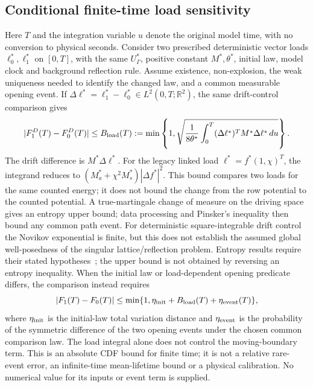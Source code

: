\documentclass[11pt]{article}
\begin{document}
\subsection{Conditional finite-time load sensitivity}
Here $T$ and the integration variable $u$ denote the original model time,
with no conversion to physical seconds.
Consider two prescribed deterministic vector loads $\ell_0^*,\ell_1^*$ on $[0,T]$,
with the same $U_\Gamma^*$, positive constant $M^*,\theta^*$, initial law,
model clock and background reflection rule. Assume existence, non-explosion,
the weak uniqueness needed to identify the changed law, and a common measurable
opening event. If $\Delta\ell^*=\ell_1^*-\ell_0^*\in L^2(0,T;\mathbb R^2)$,
the same drift-control comparison gives
\begin{equation}
 |F_1^D(T)-F_0^D(T)|\leq B_{\rm load}(T)
 :=\min\left\{1,\sqrt{\frac{1}{8\theta^*}
 \int_0^T (\Delta\ell^*)^TM^*\Delta\ell^*\,du}\right\}.
\end{equation}
The drift difference is $M^*\Delta\ell^*$. For the legacy linked load
$\ell^*=f^*(1,\chi)^T$, the integrand reduces to
$(M_a^*+\chi^2M_s^*)|\Delta f^*|^2$. This bound compares two loads
for the same counted energy; it does not bound the change from the row
potential to the counted potential. A true-martingale
change of measure on the driving space gives an entropy upper bound;
data processing and Pinsker's inequality then bound any common path event.
For deterministic square-integrable drift control the Novikov exponential
is finite, but this does not establish the assumed global well-posedness of
the singular lattice/reflection problem. Entropy results require their
stated hypotheses~\cite{Leonard2012,Lehec2025}; the upper bound is not
obtained by reversing an entropy inequality.
When the initial law or load-dependent opening predicate differs, the
comparison instead requires
\begin{equation}
 |F_1(T)-F_0(T)|\leq
 \min\{1,\eta_{\rm init}+B_{\rm load}(T)+\eta_{\rm event}(T)\},
\end{equation}
where $\eta_{\rm init}$ is the initial-law total variation distance and
$\eta_{\rm event}$ is the probability of the symmetric difference of the
two opening events under the chosen common comparison law.
The load integral alone does not control the moving-boundary term.
This is an absolute CDF bound for finite time; it is not a relative rare-event
error, an infinite-time mean-lifetime bound or a physical calibration.
No numerical value for its inputs or event term is supplied.
\end{document}
